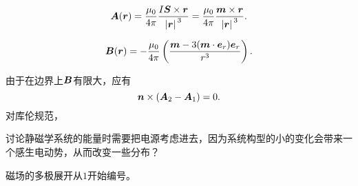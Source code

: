 \begin{equation}
    \vb*{A}(\vb*{r}) = \frac{\mu_0}{4\pi} \frac{I \vb*{S} \times \vb*{r}}{\abs*{\vb*{r}}^3} = \frac{\mu_0}{4\pi} \frac{\vb*{m} \times \vb*{r}}{\abs*{\vb*{r}}^3}.
\end{equation}

\begin{equation}
    \vb*{B}(\vb*{r}) = - \frac{\mu_0}{4\pi} \left( \frac{\vb*{m} - 3 (\vb*{m} \cdot \vb*{e}_r) \vb*{e}_r}{r^3} \right).
\end{equation}

由于在边界上$\vb*{B}$有限大，应有
\begin{equation}
    \vb*{n} \times (\vb*{A}_2 - \vb*{A}_1) = 0.
\end{equation}
对库伦规范，

讨论静磁学系统的能量时需要把电源考虑进去，因为系统构型的小的变化会带来一个感生电动势，从而改变一些分布？

磁场的多极展开从$1$开始编号。